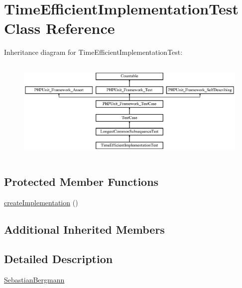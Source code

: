\hypertarget{class_sebastian_bergmann_1_1_diff_1_1_l_c_s_1_1_time_efficient_implementation_test}{}\section{Time\+Efficient\+Implementation\+Test Class Reference}
\label{class_sebastian_bergmann_1_1_diff_1_1_l_c_s_1_1_time_efficient_implementation_test}
Inheritance diagram for Time\+Efficient\+Implementation\+Test\+:\begin{figure}[H]
\begin{center}
\leavevmode
\includegraphics[height=4.955752cm]{class_sebastian_bergmann_1_1_diff_1_1_l_c_s_1_1_time_efficient_implementation_test}
\end{center}
\end{figure}
\subsection*{Protected Member Functions}
\begin{DoxyCompactItemize}
\item 
\mbox{\hyperlink{class_sebastian_bergmann_1_1_diff_1_1_l_c_s_1_1_time_efficient_implementation_test_a18a73c48948433fffa13061d1e7a35f1}{create\+Implementation}} ()
\end{DoxyCompactItemize}
\subsection*{Additional Inherited Members}


\subsection{Detailed Description}
\mbox{\hyperlink{namespace_sebastian_bergmann}{Sebastian\+Bergmann}} 

